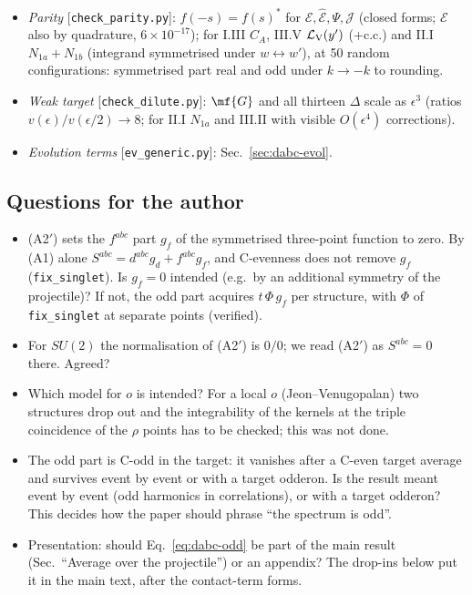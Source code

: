 \begin{itemize}
\item \emph{Parity} [\texttt{check\_parity.py}]: $f(-s)=f(s)^{*}$ for $\mathcal{E},\widehat{\mathcal{E}},\Psi,\mathcal{J}$ (closed forms; $\mathcal{E}$ also by quadrature, $6\times10^{-17}$); for I.III $C_{A}$, III.V $\mathcal{L}_{\rm V}(y')$ (+c.c.) and II.I $N_{1a}+N_{1b}$ (integrand symmetrised under $w\leftrightarrow w'$), at 50 random configurations: symmetrised part real and odd under $k\to-k$ to rounding.
\item \emph{Weak target} [\texttt{check\_dilute.py}]: $\mf{G}$ and all thirteen $\Delta$ scale as $\epsilon^{3}$ (ratios $v(\epsilon)/v(\epsilon/2)\to8$; for II.I $N_{1a}$ and III.II with visible $O(\epsilon^{4})$ corrections).
\item \emph{Evolution terms} [\texttt{ev\_generic.py}]: Sec.~\ref{sec:dabc-evol}.
\end{itemize}

\subsection{Questions for the author}\label{sec:dabc-q}
\begin{itemize}
\item[(Q1)] (A2$'$) sets the $f^{abc}$ part $g_{f}$ of the symmetrised three-point function to zero. By (A1) alone $S^{abc}=d^{abc}g_{d}+f^{abc}g_{f}$, and C-evenness does not remove $g_{f}$ (\texttt{fix\_singlet}). Is $g_{f}=0$ intended (e.g.\ by an additional symmetry of the projectile)? If not, the odd part acquires $t\,\Phi\,g_{f}$ per structure, with $\Phi$ of \texttt{fix\_singlet} at separate points (verified).
\item[(Q2)] For $SU(2)$ the normalisation of (A2$'$) is $0/0$; we read (A2$'$) as $S^{abc}=0$ there. Agreed?
\item[(Q3)] Which model for $o$ is intended? For a local $o$ (Jeon--Venugopalan) two structures drop out and the integrability of the kernels at the triple coincidence of the $\rho$ points has to be checked; this was not done.
\item[(Q4)] The odd part is C-odd in the target: it vanishes after a C-even target average and survives event by event or with a target odderon. Is the result meant event by event (odd harmonics in correlations), or with a target odderon? This decides how the paper should phrase ``the spectrum is odd''.
\item[(Q5)] Presentation: should Eq.~\eqref{eq:dabc-odd} be part of the main result (Sec.~``Average over the projectile'') or an appendix? The drop-ins below put it in the main text, after the contact-term forms.
\end{itemize}

